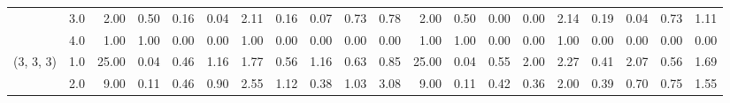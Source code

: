 \begin{tabular}{llrrrrrrrrrrrrrrrrrr}
          & 3.0 &               2.00 &                     0.50 &                                 0.16 &                             0.04 &                           2.11 &                                               0.16 &                                            0.07 &                                            0.73 &                                        0.78 &               2.00 &                     0.50 &                                 0.00 &                             0.00 &                           2.14 &                                               0.19 &                                            0.04 &                                            0.73 &                                        1.11 \\
          & 4.0 &               1.00 &                     1.00 &                                 0.00 &                             0.00 &                           1.00 &                                               0.00 &                                            0.00 &                                            0.00 &                                        0.00 &               1.00 &                     1.00 &                                 0.00 &                             0.00 &                           1.00 &                                               0.00 &                                            0.00 &                                            0.00 &                                        0.00 \\
(3, 3, 3) & 1.0 &              25.00 &                     0.04 &                                 0.46 &                             1.16 &                           1.77 &                                               0.56 &                                            1.16 &                                            0.63 &                                        0.85 &              25.00 &                     0.04 &                                 0.55 &                             2.00 &                           2.27 &                                               0.41 &                                            2.07 &                                            0.56 &                                        1.69 \\
          & 2.0 &               9.00 &                     0.11 &                                 0.46 &                             0.90 &                           2.55 &                                               1.12 &                                            0.38 &                                            1.03 &                                        3.08 &               9.00 &                     0.11 &                                 0.42 &                             0.36 &                           2.00 &                                               0.39 &                                            0.70 &                                            0.75 &                                        1.55 \\

\end{tabular}
